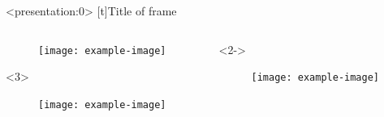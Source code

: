 \documentclass[]{beamer}
\begin{document}
\begin{frame}<presentation:0>
[t]{Title of frame}
    \begin{columns}[T,onlytextwidth]
        \begin{column}{.4\textwidth}
            \begin{minipage}{\textwidth}
                \begin{figure}
                    \texttt{[image: example-image]}
                \end{figure}
            \end{minipage}  
            \begin{onlyenv}<3>
                \begin{minipage}{\textwidth}
                    \begin{figure}
                        \texttt{[image: example-image]}
                    \end{figure}
                \end{minipage}
            \end{onlyenv}
        \end{column}
        \begin{column}{.4\textwidth}
            \begin{onlyenv}<2->
                \begin{minipage}{\textwidth}
                    \begin{figure}
                        \texttt{[image: example-image]}
                    \end{figure}
                \end{minipage}
            \end{onlyenv}
        \end{column}
    \end{columns}
\end{frame}
\end{document}

